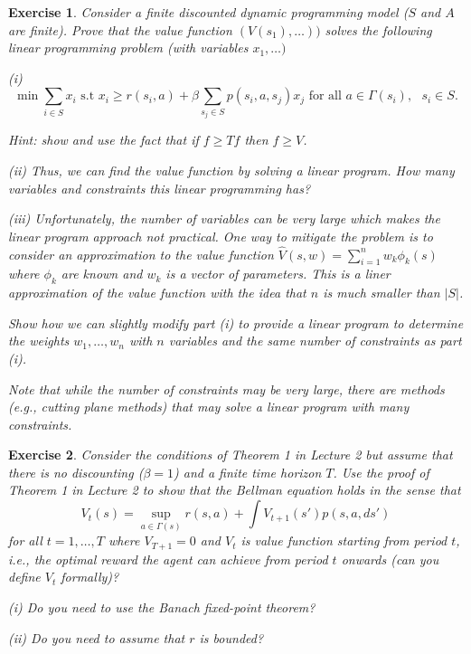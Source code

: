 \documentclass[letter,11pt]{article}
\newtheorem{exercise}{Exercise}[section]
\begin{document}
\begin{exercise}
    Consider a finite discounted dynamic programming model ($S$ and $A$ are finite). Prove that the value function $(V(s_{1}),\ldots))$ solves the following linear programming problem (with variables $x_{1},\ldots)$

(i)    $$ \min \sum _{i \in S} x_{i} \text{  s.t  } x_{i} \geq r(s_{i},a) + \beta \sum_{s_{j} \in S}p(s_{i},a,s_{j}) x_{j}  \text{ for all } a \in \Gamma(s_{i}), \text { } s_{i} \in S. $$

Hint: show and use the fact that if $f \geq Tf$ then $f \geq V$. 

(ii) Thus, we can find the value function by solving a linear program. How many variables and constraints this linear programming has?

(iii) Unfortunately, the number of variables can be very large which makes the linear program approach not practical. One way to mitigate the problem is to consider an approximation to the value function $\hat{V} (s,w) = \sum _{i=1}^{n} w_{k} \phi _{k} (s)$ where $\phi_{k}$ are known and $w_{k}$ is a vector of parameters. This is a liner approximation of the value function with the idea that $n$ is much smaller than $|S|$. 

Show how we can slightly modify part (i) to provide a linear program to determine the weights $w_{1},\ldots,w_{n}$ with $n$ variables and the same number of constraints as part (i).

Note that while the number of constraints may be very large, there are methods (e.g., cutting plane methods) that may solve a  linear program with many constraints. 


    
\end{exercise}


\begin{exercise}
    Consider the conditions of Theorem 1 in Lecture 2  but assume that there is no discounting ($\beta = 1$) and a finite time horizon $T$. Use the proof of Theorem 1 in Lecture 2 to show that the Bellman equation holds in the sense that 
    $$V_{t} (s) = \sup _{a \in \Gamma(s)} r(s,a) + \int V_{t+1}(s') p(s,a,ds') $$
    for all $t=1,\ldots,T$ where $V_{T+1} = 0$ and $V_{t}$ is value function starting from period $t$, i.e., the optimal reward the agent can achieve from period $t$ onwards (can you define $V_{t}$ formally)?


(i) Do you need to use the Banach fixed-point theorem?

(ii) Do you need to assume that $r$ is bounded? 


    
\end{exercise}
\end{document}
